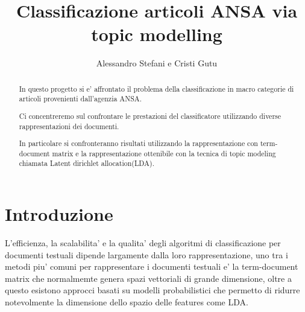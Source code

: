 \documentclass[runningheads]{llncs}
\begin{document}
%
\title{Classificazione articoli ANSA via topic modelling}
%
%
\author{%
  Alessandro Stefani e
  Cristi Gutu}
%
%
%
\maketitle
%
\begin{abstract}
In questo progetto si e' affrontato il problema della classificazione in macro categorie di articoli provenienti dall'agenzia ANSA.

Ci concentreremo sul confrontare le prestazioni del classificatore utilizzando diverse rappresentazioni dei documenti.

In particolare si confronteranno risultati utilizzando la rappresentazione con term-document matrix e la rappresentazione ottenibile con la tecnica di topic modeling chiamata Latent dirichlet allocation(LDA)\cite{LDA}.

\end{abstract}


\section{Introduzione}
\label{sec:introduzione}
L'efficienza, la scalabilita' e la qualita' degli algoritmi di classificazione per documenti testuali dipende largamente dalla loro rappresentazione, uno tra i metodi piu' comuni per rappresentare i documenti testuali e' la term-document matrix che normalmemte genera spazi vettoriali di grande dimensione, oltre a questo esistono approcci basati su modelli probabilistici che permetto di ridurre notevolmente la dimensione dello spazio delle features come LDA.
\end{document}
